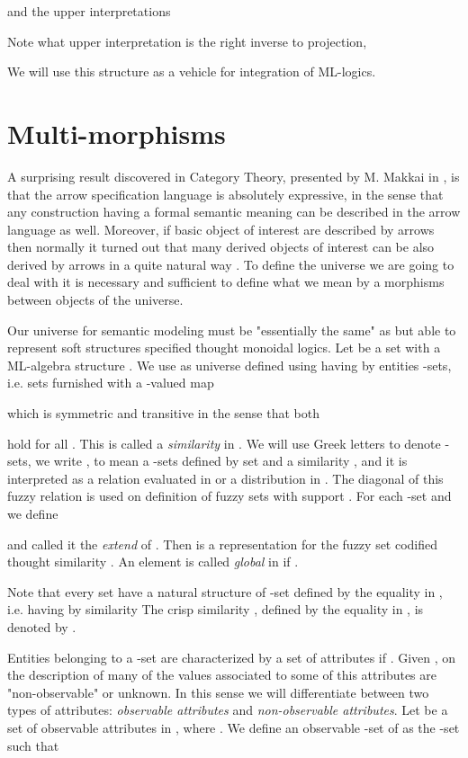 \documentclass[oribibl]{llncs}
\begin{document}
and the upper interpretations

Note what upper interpretation is the right inverse to projection,

We will use this structure as a vehicle for integration of ML-logics.

\section{Multi-morphisms}\label{multi-morphisms}

A surprising result discovered in Category Theory, presented by M. Makkai in \cite{Makki89}, is that the arrow specification language is absolutely expressive, in the sense that any construction having a formal semantic meaning can be described in the arrow language as well. Moreover, if basic object of interest are described by arrows then normally it turned out that many derived objects of interest can be also derived by arrows in a quite natural way \cite{Diskin99}. To define the universe we are going to deal with it is necessary and sufficient to define what we mean by a morphisms between objects of the universe.

Our universe for semantic modeling must be "essentially the same" as  but able to represent soft structures specified thought monoidal logics. Let  be a set with a ML-algebra structure . We use as universe  defined using   having by entities -sets, i.e. sets  furnished with a -valued map

which is symmetric and transitive in the sense that both

hold for all . This is called a \emph{similarity} in . We will use Greek letters to denote  -sets, we write , to mean a -sets defined by set  and a similarity , and it is interpreted as a relation evaluated in  or a distribution in . The diagonal of this fuzzy relation is used on definition of fuzzy sets with support . For each -set  and  we define

and called it the \emph{extend} of . Then  is a representation for the fuzzy set  codified thought similarity . An element  is called \emph{global} in  if .

Note that every set  have a natural structure of -set defined by the equality  in , i.e. having by similarity
The crisp similarity , defined by the equality in , is denoted by .


Entities belonging to a -set  are characterized by a set of attributes  if . Given , on the description of  many of the values associated to some of this attributes are "non-observable" or unknown. In this sense we will differentiate between two types of attributes: \emph{observable attributes} and \emph{non-observable attributes}. Let   be a set of observable attributes in , where . We define an observable -set of  as the  -set  such that
\end{document}
